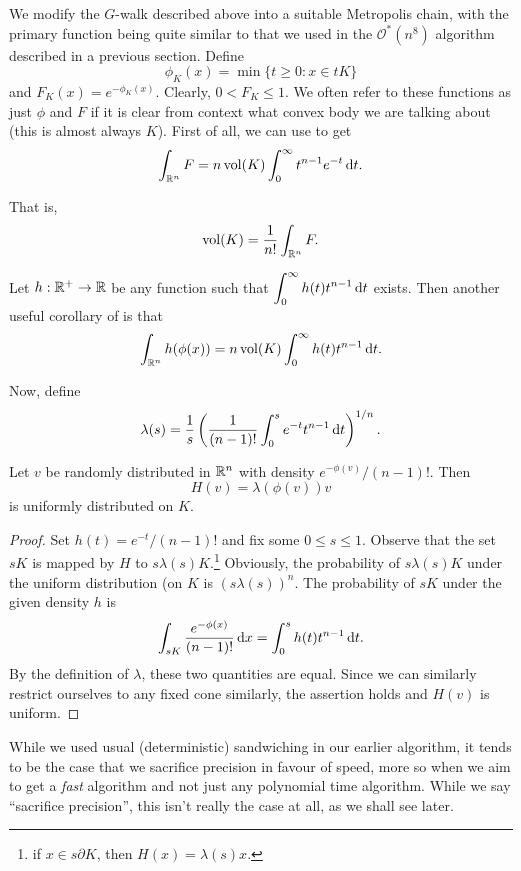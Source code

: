 We modify the $G$-walk described above into a suitable Metropolis chain, with the primary function being quite similar to that we used in the $\mathcal{O}^*(n^8)$ algorithm described in a previous section. Define
\[ \phi_K(x) = \min\{t\geq 0 : x\in tK\} \]
and $F_K(x)=e^{-\phi_K(x)}$. Clearly, $0<F_K \leq 1$. We often refer to these functions as just $\phi$ and $F$ if it is clear from context what convex body we are talking about (this is almost always $K$). First of all, we can use  to get
\[ \int_{\mathbb{R}^n} F = n\operatorname{vol}(K)\int_0^\infty t^{n-1}e^{-t}\operatorname{d}\!{t}. \]

That is,
\begin{equation}
	\operatorname{vol}(K) = \frac{1}{n!} \int_{\mathbb{R}^n} F.
\end{equation}

Let $h:\mathbb{R}^+\to\mathbb{R}$ be any function such that $\displaystyle\int_0^\infty h(t)t^{n-1}\operatorname{d}\!{t}$ exists. Then another useful corollary of  is that
\begin{equation}
	\label{eqn: 4.20}
	\int_{\mathbb{R}^n} h(\phi(x)) = n\operatorname{vol}(K)\int_0^\infty h(t)t^{n-1}\operatorname{d}\!{t}.
\end{equation}


Now, define
\[ \lambda(s) = \frac{1}{s}\left(\frac{1}{(n-1)!}\int_0^s e^{-t}t^{n-1}\operatorname{d}\!{t}\right)^{1/n}. \]
\begin{lemma}
	\label{final thing uniformly distrib}
	Let $v$ be randomly distributed in $\mathbb{R}^n$ with density $e^{-\phi(v)}/(n-1)!$. Then
	\[ H(v) = \lambda(\phi(v))v \]
	is uniformly distributed on $K$.
\end{lemma}
\begin{proof}
	Set $h(t)=e^{-t}/(n-1)!$ and fix some $0\leq s\leq 1$. Observe that the set $sK$ is mapped by $H$ to $s\lambda(s)K$.\footnote{if $x\in s\partial K$, then $H(x)=\lambda(s)x$.} Obviously, the probability of $s\lambda(s)K$ under the uniform distribution (on $K$ is $(s\lambda(s))^n$. The probability of $sK$ under the given density $h$ is
	\[ \int_{sK} \frac{e^{-\phi(x)}}{(n-1)!} \operatorname{d}\!{x} = \int_0^s h(t) t^{n-1} \operatorname{d}\!{t}. \]
	By the definition of $\lambda$, these two quantities are equal. Since we can similarly restrict ourselves to any fixed cone similarly, the assertion holds and $H(v)$ is uniform.
\end{proof}


While we used usual (deterministic) sandwiching in our earlier algorithm, it tends to be the case that we sacrifice precision in favour of speed, more so when we aim to get a \textit{fast} algorithm and not just any polynomial time algorithm. While we say ``sacrifice precision'', this isn't really the case at all, as we shall see later.\\

